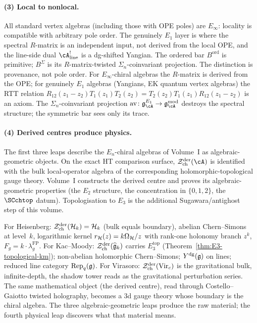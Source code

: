 \paragraph{(3) Local to nonlocal.}
All standard vertex algebras (including those with OPE poles)
are $E_\infty$: locality is compatible with arbitrary pole
order. The genuinely $E_1$ layer is where the spectral
$R$-matrix is an independent input, not derived from the local
OPE, and the line-side dual $\cA^!_{\mathrm{line}}$ is a
dg-shifted Yangian. The ordered bar $B^{\mathrm{ord}}$ is
primitive; $B^{\Sigma}$ is its $R$-matrix-twisted
$\Sigma_n$-coinvariant projection. The distinction is
provenance, not pole order. For $E_\infty$-chiral algebras
the $R$-matrix is derived from the OPE; for genuinely $E_1$
algebras (Yangians, EK quantum vertex algebras) the RTT relation
$R_{12}(z_1{-}z_2) T_1(z_1) T_2(z_2) =
T_2(z_2) T_1(z_1) R_{12}(z_1{-}z_2)$ is an axiom.
The $\Sigma_n$-coinvariant projection
$\mathrm{av}\colon\mathfrak{g}^{E_1}_\cA \to \mathfrak{g}^{\mathrm{mod}}_\cA$
destroys the spectral structure; the symmetric bar sees only
its trace.

\paragraph{(4) Derived centres produce physics.}
The first three leaps describe the $E_n$-chiral algebras of
Volume~I as algebraic-geometric objects. On the exact HT comparison
surface, $\cZ^{\mathrm{der}}_{\mathrm{ch}}(\cA)$ is identified with
the bulk local-operator algebra of the corresponding
holomorphic-topological gauge theory. Volume~I constructs the
derived centre and proves its algebraic-geometric properties
(the $E_2$ structure, the concentration in $\{0,1,2\}$, the
$\SCchtop$ datum). Topologisation to $E_3$ is the additional
Sugawara/antighost step of this volume.

For Heisenberg:
$\mathcal{Z}^{\mathrm{der}}_{\mathrm{ch}}(\mathcal{H}_k) = \mathcal{H}_k$ (bulk equals
boundary), abelian Chern--Simons at level~$k$, logarithmic kernel
$r_{\mathcal{H}}(z)=k\Omega_{\mathcal{H}}/z$ with rank-one holonomy branch $z^k$,
$F_g = k\cdot\lambda_g^{\mathrm{FP}}$. For Kac--Moody:
$\mathcal{Z}^{\mathrm{der}}_{\mathrm{ch}}(\widehat{\mathfrak{g}}_k)$ carries
$E_3^{\mathrm{top}}$
(Theorem~\ref{thm:E3-topological-km}); non-abelian holomorphic
Chern--Simons; $Y^{\mathrm{dg}}(\mathfrak{g})$ on lines; reduced line category
$\operatorname{Rep}_q(\mathfrak{g})$. For Virasoro:
$\mathcal{Z}^{\mathrm{der}}_{\mathrm{ch}}(\mathrm{Vir}_c)$ is the
gravitational bulk, infinite-depth, the shadow tower reads as
the gravitational perturbation series. The same mathematical
object (the derived centre), read through Costello--Gaiotto
twisted holography, becomes a 3d gauge theory whose boundary is
the chiral algebra. The three algebraic-geometric leaps produce
the raw material; the fourth physical leap discovers what that
material means.

